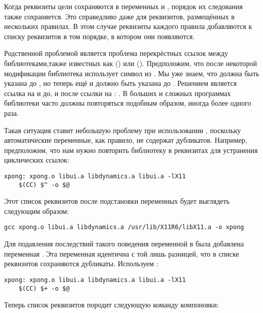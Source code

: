 Когда реквизиты цели сохраняются в переменных \variable{\$\^} и
, порядок их следования также сохраняется. Это
справедливо даже для реквизитов, размещённых в нескольких правилах. В
этом случае реквизиты каждого правила добавляются к списку реквизитов
в том порядке, в котором они появляются.

Родственной проблемой является проблема перекрёстных ссылок между
библиотеками,также известных как 
() или 
(). Предположим, что после некоторой
модификации библиотека  использует символ из .
Мы уже знаем, что  должна быть указана до , но
теперь ещё и  должно быть указана до .
Решением является ссылка на  и до, и после ссылки на
: . В больших и сложных программах
библиотеки часто должны повторяться подобным образом, иногда более
одного раза.

Такая ситуация ставит небольшую проблему при использовании \GNUmake{},
поскольку автоматические переменные, как правило, не содержат
дубликатов. Например, предположим, что нам нужно повторить библиотеку
в реквизитах для устранения циклических ссылок:

{\footnotesize
\begin{verbatim}
xpong: xpong.o libui.a libdynamics.a libui.a -lX11
    $(CC) $^ -o $@
\end{verbatim}
}

Этот список реквизитов после подстановки переменных будет выглядеть
следующим образом:

{\footnotesize
\begin{verbatim}
gcc xpong.o libui.a libdynamics.a /usr/lib/X11R6/libX11.a -o xpong
\end{verbatim}
}

Для подавления последствий такого поведения переменной \variable{\$\^}
в \GNUmake{} была добавлена переменная \variable{\$+}. Эта переменная
идентична \variable{\$\^} с той лишь разницей, что в списке реквизитов
сохраняются дубликаты. Используем \variable{\$+}:

{\footnotesize
\begin{verbatim}
xpong: xpong.o libui.a libdynamics.a libui.a -lX11
    $(CC) $+ -o $@
\end{verbatim}
}

Теперь список реквизитов породит следующую команду компоновки:

